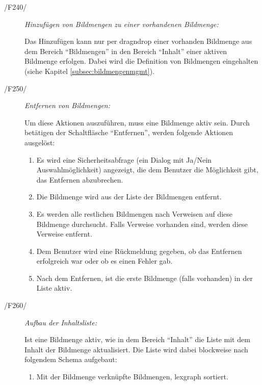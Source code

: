\begin{description}
\begin{itemize}
			\end{itemize}
		
		\item[/F240/] \textit{Hinzufügen von Bildmengen zu einer vorhandenen Bildmenge:}\par Das Hinzufügen kann nur per \gls{dragndrop} einer vorhanden Bildmenge aus dem Bereich "`Bildmengen"' in den Bereich "`Inhalt"' einer aktiven Bildmenge erfolgen. Dabei wird die Definition von Bildmengen eingehalten (siehe Kapitel \ref{subsec:bildmengenmgmt}).
		
		\item[/F250/] \textit{Entfernen von Bildmengen:}\par Um diese Aktionen auszuführen, muss eine Bildmenge aktiv sein. Durch betätigen der Schaltfläsche "`Entfernen"', werden folgende Aktionen ausgelöst:
			
			\begin{enumerate}
			
				\item Es wird eine Sicherheitsabfrage (ein Dialog mit Ja/Nein Auswahlmöglichkeit) angezeigt, die dem Benutzer die Möglichkeit gibt, das Entfernen abzubrechen.
				
				\item Die Bildmenge wird aus der Liste der Bildmengen entfernt.
				
				\item Es werden alle restlichen Bildmengen nach Verweisen auf diese Bildmenge durchsucht. Falls Verweise vorhanden sind, werden diese Verweise entfernt.
				
				\item Dem Benutzer wird eine Rückmeldung gegeben, ob das Entfernen erfolgreich war oder ob es einen Fehler gab.
				
				\item Nach dem Entfernen, ist die erste Bildmenge (falls vorhanden) in der Liste aktiv.
			
			\end{enumerate}

		\item[/F260/] \textit{Aufbau der Inhaltsliste:}\par Ist eine Bildmenge aktiv, wie in dem Bereich "`Inhalt"' die Liste mit dem Inhalt der Bildmenge aktualisiert. Die Liste wird dabei blockweise nach folgendem Schema aufgebaut:
		
			\begin{enumerate}
			
				\item Mit der Bildmenge verknüpfte Bildmengen, \gls{lexgraph} sortiert.
			

\end{enumerate}
\end{description}
